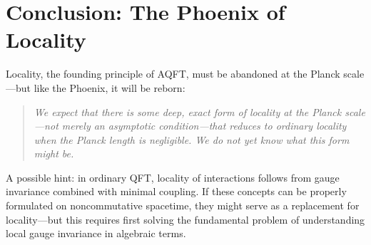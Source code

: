 \documentclass[11pt,a4paper]{article}
\begin{document}
\section{Conclusion: The Phoenix of Locality}

Locality, the founding principle of AQFT, must be abandoned at the
Planck scale---but like the Phoenix, it will be reborn:
\begin{quote}
\emph{We expect that there is some deep, exact form of locality at the
Planck scale---not merely an asymptotic condition---that reduces to
ordinary locality when the Planck length is negligible. We do not yet
know what this form might be.}
\end{quote}

A possible hint: in ordinary QFT, locality of interactions follows from
gauge invariance combined with minimal coupling. If these concepts can
be properly formulated on noncommutative spacetime, they might serve
as a replacement for locality---but this requires first solving the
fundamental problem of understanding local gauge invariance in algebraic
terms.
\end{document}
